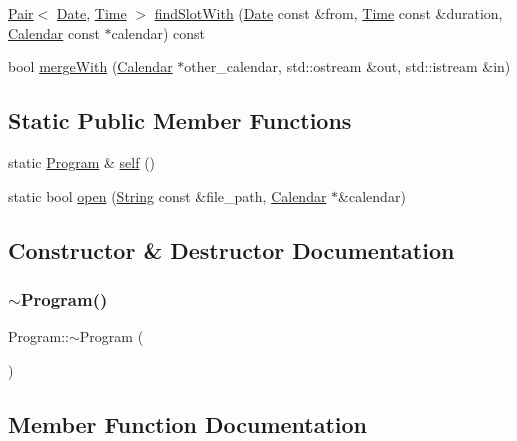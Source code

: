 \begin{DoxyCompactItemize}
\item 
\hyperlink{structPair}{Pair}$<$ \hyperlink{classDate}{Date}, \hyperlink{classTime}{Time} $>$ \hyperlink{classProgram_aa2159591c5711c2846c261cd672643d6}{find\+Slot\+With} (\hyperlink{classDate}{Date} const \&from, \hyperlink{classTime}{Time} const \&duration, \hyperlink{classCalendar}{Calendar} const $\ast$calendar) const
\item 
bool \hyperlink{classProgram_aea58a5865e12fbbb2dda1563e66d092a}{merge\+With} (\hyperlink{classCalendar}{Calendar} $\ast$other\+\_\+calendar, std\+::ostream \&out, std\+::istream \&in)
\end{DoxyCompactItemize}
\subsection*{Static Public Member Functions}
\begin{DoxyCompactItemize}
\item 
static \hyperlink{classProgram}{Program} \& \hyperlink{classProgram_a6f703bef529f93987481e04ab6f3014a}{self} ()
\item 
static bool \hyperlink{classProgram_ad12fa0703d93dbec2b2badc96ab97cf6}{open} (\hyperlink{classString}{String} const \&file\+\_\+path, \hyperlink{classCalendar}{Calendar} $\ast$\&calendar)
\end{DoxyCompactItemize}


\subsection{Constructor \& Destructor Documentation}
\mbox{\label{classProgram_a986aef1c50e1d338a3315a47ba6df549}} 
\subsubsection{\texorpdfstring{$\sim$\+Program()}{~Program()}}
{\footnotesize\ttfamily Program\+::$\sim$\+Program (\begin{DoxyParamCaption}{ }\end{DoxyParamCaption})}



\subsection{Member Function Documentation}
\mbox{\label{classProgram_a36916661bfce488ed07dbc2a7f3fadce}} 
